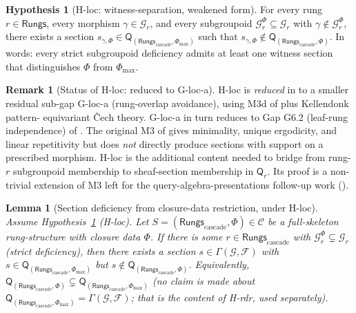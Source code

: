 \documentclass[11pt, a4paper]{amsart}
\newtheorem{lemma}[theorem]{Lemma}
\theoremstyle{definition}
\newtheorem{remark}[theorem]{Remark}
\newtheorem{hypothesis}[theorem]{Hypothesis}
\newcommand{\Rungs}{\mathsf{Rungs}}
\newcommand{\catC}{\mathcal{C}}
\newcommand{\Fcal}{\mathcal{F}}
\newcommand{\Gcal}{\mathcal{G}}
\newcommand{\Qalg}{\mathsf{Q}}
\begin{document}
\begin{hypothesis}[H-loc: witness-separation, weakened form]
\label{hyp:loc}
For every rung $r \in \Rungs$, every morphism
$\gamma \in \Gcal_r$, and every subgroupoid
$\Gcal_r^\Phi \subseteq \Gcal_r$ with $\gamma \notin
\Gcal_r^\Phi$, there exists a section $s_{\gamma,\Phi} \in
\Qalg_{(\Rungs_{\mathrm{cascade}}, \Phi_{\max})}$ such that
$s_{\gamma, \Phi} \notin \Qalg_{(\Rungs_{\mathrm{cascade}},
\Phi)}$. In words: every strict subgroupoid deficiency admits
at least one witness section that distinguishes $\Phi$ from
$\Phi_{\max}$.
\end{hypothesis}

\begin{remark}[Status of H-loc: reduced to G-loc-a]
\label{rmk:H-loc-status}
H-loc is \emph{reduced} in \cite{CascadeHlocClosure} to a
smaller residual sub-gap G-loc-a (rung-overlap avoidance),
using M3d of \cite{CascadeMetaLayer} plus Kellendonk pattern-
equivariant Čech theory. G-loc-a in turn reduces to Gap G6.2
(leaf-rung independence) of
\cite{CascadeObserverQueryAlgebra}. The original M3 of
\cite{CascadeMetaLayer} gives minimality, unique ergodicity,
and linear repetitivity but does \emph{not} directly produce
sections with support on a prescribed
morphism. H-loc is the additional content needed to bridge
from rung-$r$ subgroupoid membership to sheaf-section
membership in $\Qalg_r$. Its proof is a non-trivial extension
of M3 left for the query-algebra-presentations follow-up work
(\cite[Gap G6.1]{CascadeObserverQueryAlgebra}).
\end{remark}

\begin{lemma}[Section deficiency from closure-data restriction,
  under H-loc]
\label{lem:char-restriction}
Assume Hypothesis~\ref{hyp:loc} (H-loc). Let $S =
(\Rungs_{\mathrm{cascade}}, \Phi) \in \catC$ be a full-skeleton
rung-structure with closure data $\Phi$. If there is some $r
\in \Rungs_{\mathrm{cascade}}$ with $\Gcal_r^\Phi \subsetneq
\Gcal_r$ (strict deficiency), then there exists a section $s
\in \Gamma(\Gcal, \Fcal)$ with $s \in
\Qalg_{(\Rungs_{\mathrm{cascade}}, \Phi_{\max})}$ but $s
\notin \Qalg_{(\Rungs_{\mathrm{cascade}}, \Phi)}$. Equivalently,
$\Qalg_{(\Rungs_{\mathrm{cascade}}, \Phi)} \subsetneq
\Qalg_{(\Rungs_{\mathrm{cascade}}, \Phi_{\max})}$
(no claim is made about $\Qalg_{(\Rungs_{\mathrm{cascade}},
\Phi_{\max})} = \Gamma(\Gcal, \Fcal)$; that is the content of
H-rdr, used separately).
\end{lemma}
\end{document}
